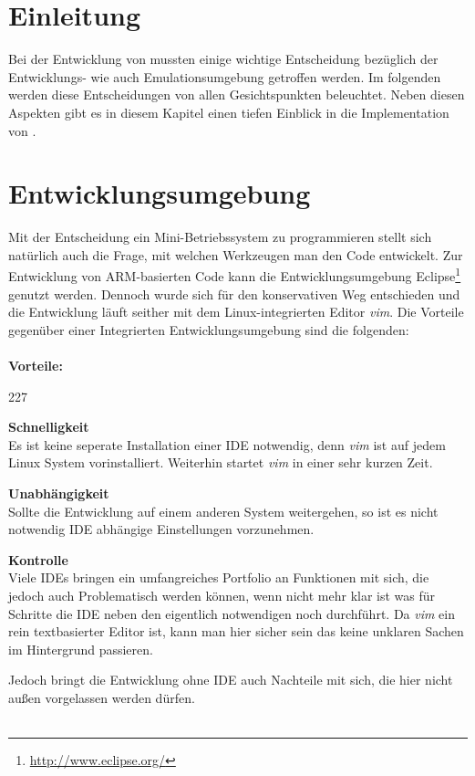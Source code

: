 \section{Einleitung}
Bei der Entwicklung von \mops mussten einige wichtige Entscheidung bez\"uglich der Entwicklungs- wie auch Emulationsumgebung getroffen werden. Im folgenden werden diese Entscheidungen von allen Gesichtspunkten beleuchtet. Neben diesen Aspekten gibt es in diesem Kapitel einen tiefen Einblick in die Implementation von \mops. 

\section{Entwicklungsumgebung}
Mit der Entscheidung ein Mini-Betriebssystem zu programmieren stellt sich nat\"urlich auch die Frage, mit welchen Werkzeugen man den Code entwickelt. Zur Entwicklung von ARM-basierten Code kann die Entwicklungsumgebung Eclipse\footnote{\url{http://www.eclipse.org/}}  genutzt werden. Dennoch wurde sich f\"ur den konservativen Weg entschieden und die Entwicklung l\"auft seither mit dem Linux-integrierten Editor \textit{vim}. Die Vorteile gegen\"uber einer Integrierten Entwicklungsumgebung sind die folgenden: \\\\
\textbf{Vorteile:}
\begin{dinglist}{227}
	\item{\textbf{Schnelligkeit}}\\
	 Es ist keine seperate Installation einer IDE notwendig, denn \textit{vim} ist auf jedem Linux System vorinstalliert. Weiterhin startet \textit{vim} in einer sehr kurzen Zeit.
	\item{\textbf{Unabh\"angigkeit}}\\
	Sollte die Entwicklung auf einem anderen System weitergehen, so ist es nicht notwendig IDE abh\"angige Einstellungen vorzunehmen.
	\item{\textbf{Kontrolle}}\\
	Viele IDEs bringen ein umfangreiches Portfolio an Funktionen mit sich, die jedoch auch Problematisch werden k\"onnen, wenn nicht mehr klar ist was f\"ur Schritte die IDE neben den eigentlich notwendigen noch durchf\"uhrt. Da \textit{vim} ein rein textbasierter Editor ist, kann man hier sicher sein das keine unklaren Sachen im Hintergrund passieren.
\end{dinglist}
Jedoch bringt die Entwicklung ohne IDE auch Nachteile mit sich, die hier nicht au\ss en vorgelassen werden d\"urfen.\\ \\

